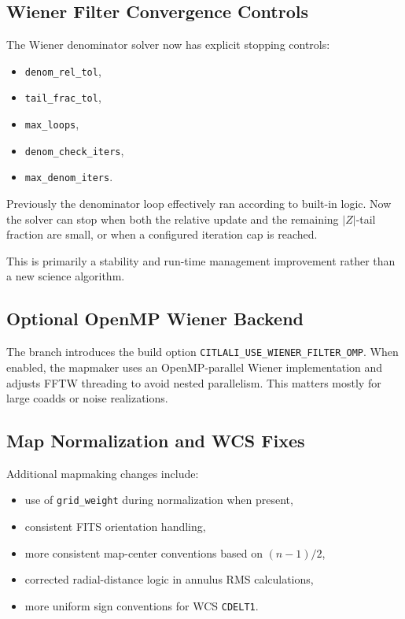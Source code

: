 \documentclass[11pt]{article}
\begin{document}
\subsection{Wiener Filter Convergence Controls}

The Wiener denominator solver now has explicit stopping controls:

\begin{itemize}[leftmargin=1.5em]
\item \texttt{denom\_rel\_tol},
\item \texttt{tail\_frac\_tol},
\item \texttt{max\_loops},
\item \texttt{denom\_check\_iters},
\item \texttt{max\_denom\_iters}.
\end{itemize}

Previously the denominator loop effectively ran according to built-in logic.
Now the solver can stop when both the relative update and the remaining
\(|Z|\)-tail fraction are small, or when a configured iteration cap is reached.

This is primarily a stability and run-time management improvement rather than a
new science algorithm.

\subsection{Optional OpenMP Wiener Backend}

The branch introduces the build option
\texttt{CITLALI\_USE\_WIENER\_FILTER\_OMP}. When enabled, the mapmaker uses an
OpenMP-parallel Wiener implementation and adjusts FFTW threading to avoid nested
parallelism. This matters mostly for large coadds or noise realizations.

\subsection{Map Normalization and WCS Fixes}

Additional mapmaking changes include:

\begin{itemize}[leftmargin=1.5em]
\item use of \texttt{grid\_weight} during normalization when present,
\item consistent FITS orientation handling,
\item more consistent map-center conventions based on \((n-1)/2\),
\item corrected radial-distance logic in annulus RMS calculations,
\item more uniform sign conventions for WCS \texttt{CDELT1}.
\end{itemize}
\end{document}
